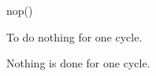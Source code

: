 

\format

nop()

\purpose

To do nothing for one cycle.

\description

Nothing is done for one cycle.
